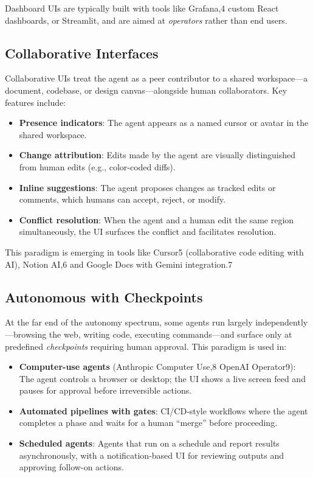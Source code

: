 Dashboard UIs are typically built with tools like Grafana,4 custom React dashboards, or Streamlit, and are aimed at \emph{operators} rather than end users.

\subsection{Collaborative Interfaces}
\label{collaborative-interfaces}

Collaborative UIs treat the agent as a peer contributor to a shared workspace---a document, codebase, or design canvas---alongside human collaborators. Key features include:

\begin{itemize}
  \item \textbf{Presence indicators}: The agent appears as a named cursor or avatar in the shared workspace.
  \item \textbf{Change attribution}: Edits made by the agent are visually distinguished from human edits (e.g., color-coded diffs).
  \item \textbf{Inline suggestions}: The agent proposes changes as tracked edits or comments, which humans can accept, reject, or modify.
  \item \textbf{Conflict resolution}: When the agent and a human edit the same region simultaneously, the UI surfaces the conflict and facilitates resolution.
\end{itemize}

This paradigm is emerging in tools like Cursor5 (collaborative code editing with AI), Notion AI,6 and Google Docs with Gemini integration.7

\subsection{Autonomous with Checkpoints}
\label{autonomous-with-checkpoints}

At the far end of the autonomy spectrum, some agents run largely independently---browsing the web, writing code, executing commands---and surface only at predefined \emph{checkpoints} requiring human approval. This paradigm is used in:

\begin{itemize}
  \item \textbf{Computer-use agents} (Anthropic Computer Use,8 OpenAI Operator9): The agent controls a browser or desktop; the UI shows a live screen feed and pauses for approval before irreversible actions.
  \item \textbf{Automated pipelines with gates}: CI/CD-style workflows where the agent completes a phase and waits for a human ``merge'' before proceeding.
  \item \textbf{Scheduled agents}: Agents that run on a schedule and report results asynchronously, with a notification-based UI for reviewing outputs and approving follow-on actions.
\end{itemize}

